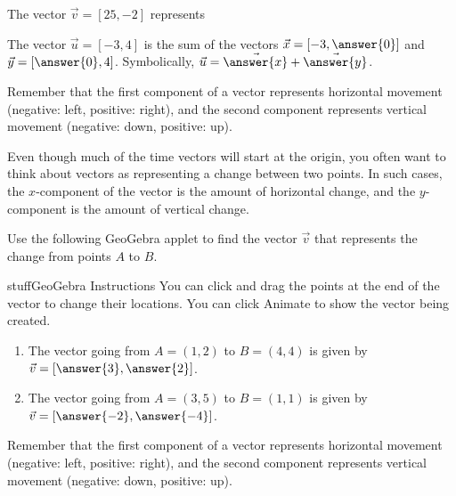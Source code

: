 \documentclass{ximera}
\begin{document}
\begin{problem}

The vector $\vec{v}=[25, -2]$ represents \begin{multipleChoice}
\end{multipleChoice}

The vector $\vec{u}=[-3,4]$ is the sum of the vectors $\vec{x}=[-3,\answer{0}]$ and $\vec{y}=[\answer{0},4]$. Symbolically, $\vec{u}=\vec{\answer{x}}+\vec{\answer{y}}$.

\begin{feedback}
Remember that the first component of a vector represents horizontal movement (negative: left, positive: right), and the second component represents vertical movement (negative: down, positive: up).
\end{feedback}

\end{problem}

Even though much of the time vectors will start at the origin, you often want to think about vectors as representing a change between two points. In such cases, the $x$-component of the vector is the amount of horizontal change, and the $y$-component is the amount of vertical change.

\begin{problem}
    Use the following GeoGebra applet to find the vector $\vec{v}$ that represents the change from points $A$ to $B$.

    \begin{expandable}{stuff}{GeoGebra Instructions}
        You can click and drag the points at the end of the vector to change their locations. You can click Animate to show the vector being created. 
    \end{expandable}

    \begin{center}
    \end{center}

    \begin{enumerate}
        \item The vector going from $A=(1,2)$ to $B=(4,4)$ is given by $\vec{v}=[\answer{3},\answer{2}]$.
        \item The vector going from $A=(3,5)$ to $B=(1,1)$ is given by $\vec{v}=[\answer{-2},\answer{-4}]$.
    \end{enumerate}
    \begin{feedback}
        Remember that the first component of a vector represents horizontal movement (negative: left, positive: right), and the second component represents vertical movement (negative: down, positive: up).
    \end{feedback}
\end{problem}
\end{document}
